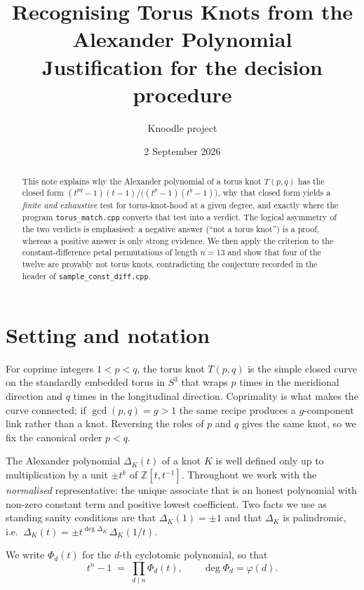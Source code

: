 \documentclass[11pt]{article}
\title{Recognising Torus Knots from the Alexander Polynomial\\
\large Justification for the \code{torus\_match} decision procedure}
\author{Knoodle project}
\date{2 September 2026}
\theoremstyle{definition}
\newcommand{\Deltaa}{\Delta}
\newcommand{\T}[2]{T(#1,#2)}
\newcommand{\Cyc}[1]{\Phi_{#1}}
\newcommand{\Z}{\mathbb{Z}}
\newcommand{\code}[1]{\texttt{#1}}
\begin{document}
\maketitle

\begin{abstract}
This note explains why the Alexander polynomial of a torus knot $\T{p}{q}$ has the
closed form $(t^{pq}-1)(t-1)\big/\big((t^{p}-1)(t^{q}-1)\big)$, why that closed form
yields a \emph{finite and exhaustive} test for torus-knot-hood at a given degree, and
exactly where the program \code{torus\_match.cpp} converts that test into a verdict.
The logical asymmetry of the two verdicts is emphasised: a negative answer
(``not a torus knot'') is a proof, whereas a positive answer is only strong evidence.
We then apply the criterion to the constant-difference petal permutations of length
$n=13$ and show that four of the twelve are provably not torus knots, contradicting
the conjecture recorded in the header of \code{sample\_const\_diff.cpp}.
\end{abstract}

\tableofcontents

\section{Setting and notation}

For coprime integers $1 < p < q$, the torus knot $\T{p}{q}$ is the simple closed curve
on the standardly embedded torus in $S^{3}$ that wraps $p$ times in the meridional
direction and $q$ times in the longitudinal direction. Coprimality is what makes the
curve connected; if $\gcd(p,q)=g>1$ the same recipe produces a $g$-component link
rather than a knot. Reversing the roles of $p$ and $q$ gives the same knot, so we fix
the canonical order $p<q$.

The Alexander polynomial $\Deltaa_{K}(t)$ of a knot $K$ is well defined only up to
multiplication by a unit $\pm t^{k}$ of $\Z[t,t^{-1}]$. Throughout we work with the
\emph{normalised} representative: the unique associate that is an honest polynomial
with non-zero constant term and positive lowest coefficient. Two facts we use as
standing sanity conditions are that $\Deltaa_{K}(1)=\pm 1$ and that $\Deltaa_{K}$ is
palindromic, i.e.\ $\Deltaa_{K}(t) = \pm t^{\deg \Deltaa_{K}}\,\Deltaa_{K}(1/t)$.

We write $\Cyc{d}(t)$ for the $d$-th cyclotomic polynomial, so that
\begin{equation}\label{eq:cyclo}
t^{n}-1 \;=\; \prod_{d \mid n} \Cyc{d}(t),
\qquad
\deg \Cyc{d} = \varphi(d).
\end{equation}
\end{document}
